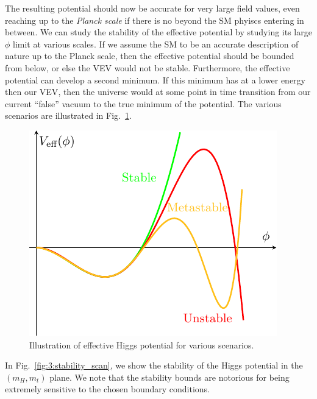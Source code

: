 The resulting potential should now be accurate for very large field values, even reaching up to the \textit{Planck scale} if there is no beyond the \acs{SM} phyiscs entering in between. We can study the stability of the effective potential by studying its large $\phi$ limit at various scales. If we assume the \acs{SM} to be an accurate description of nature up to the Planck scale, then the effective potential should be bounded from below, or else the \acs{VEV} would not be stable. Furthermore, the effective potential can develop a second minimum. If this minimum has at a lower energy then our \acs{VEV}, then the universe would at some point in time transition from our current ``false'' vacuum to the true minimum of the potential. The various scenarios are illustrated in Fig.~\ref{fig:3:Veff_illustration}.
\begin{figure}[h]
\centering
\includegraphics[scale=1.1]{Images/Veff_illustration.pdf}
\caption{Illustration of effective Higgs potential for various scenarios.}
\label{fig:3:Veff_illustration}
\end{figure}
In Fig.~\ref{fig:3:stability_scan}, we show the stability of the Higgs potential in the $(m_H, m_t)$ plane. We note that the stability bounds are notorious for being extremely sensitive to the chosen boundary conditions.

